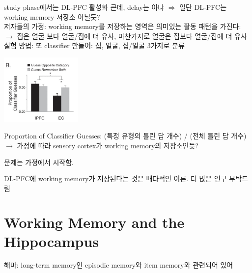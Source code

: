 \documentclass[../note.tex]{subfiles}
\begin{document}
{  study phase에서는 DL-PFC 활성화 큰데, delay는 아냐 $\Rightarrow$ 일단 DL-PFC는 working memory 저장소 아닐듯?\\

  저자들의 가정: working memory를 저장하는 영역은 의미있는 활동 패턴을 가진다:\\
  $\rightarrow$ 집은 얼굴 보다 얼굴/집에 더 유사, 마찬가지로 얼굴은 집보다 얼굴/집에 더 유사\\

  실험 방법: 또 classifier 만들어: 집, 얼굴, 집/얼굴 3가지로 분류\\

  \begin{center}
    \includegraphics[width=0.3\textwidth]{image/ch6_sensory_cla}
    \label{fig:ch6_sensory_cla}
  \end{center}
  Proportion of Classifier Guesses: (특정 유형의 틀린 답 개수) / (전체 틀린 답 개수)\\
  $\longrightarrow$ 가정에 따라 sensory cortex가 working memory의 저장소인듯?

  문제는 가정에서 시작함.
}
DL-PFC에 working memory가 저장된다는 것은 배타적인 이론. 더 많은 연구 부탁드림

\section{Working Memory and the Hippocampus}
해마: long-term memory인 episodic memory와 item memory와 관련되어 있어\\
\end{document}
